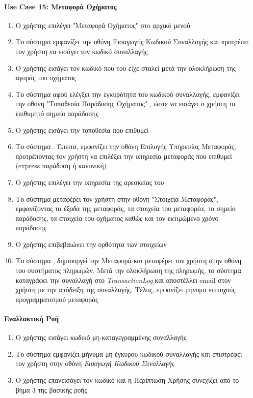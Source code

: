 \documentclass{../ol-softwaremanual}
\begin{document}
	\paragraph{\en Use Case 15: \gr Μεταφορά Οχήματος}  
	\begin{enumerate}
		\item Ο χρήστης επιλέγει \en"\gr Μεταφορά Οχήματος\en" \gr στο αρχικό μενού
		\item Το σύστημα εμφανίζει την οθόνη Εισαγωγής Κωδικού Συναλλαγής και προτρέπει τον χρήστη να εισάγει τον κωδικό συναλλαγής
		\item Ο χρήστης εισάγει τον κωδικό που του είχε σταλεί μετά την ολοκλήρωση της αγοράς του οχήματος
		\item Το σύστημα αφού ελέγξει την εγκυρότητα του κωδικού συναλλαγής, εμφανίζει την οθόνη \en"\gr Τοποθεσία Παράδοσης Οχήματος\en" \gr, ώστε να εισάγει ο χρήστη το επιθυμητό σημείο παράδοσης
		\item Ο χρήστης εισάγει την τοποθεσία που επιθυμεί
		\item Το σύστημα . Έπειτα, εμφανίζει την οθόνη Επιλογής Υπηρεσίας Μεταφοράς, προτρέποντας τον χρήστη να επιλέξει την υπηρεσία μεταφοράς που επιθυμεί (\en express \gr παράδοση ή κανονική)		
		\item Ο χρήστης επιλέγει την υπηρεσία της αρεσκείας του
		\item Το σύστημα μεταφέρει τον χρήστη στην οθόνη \en"\gr Στοιχεία Μεταφοράς\en"\gr, εμφανίζοντας τα έξοδα της μεταφοράς, τα στοιχεία του μεταφορέα, το σημείο παράδοσης, τα στοιχεία του οχήματος καθώς και τον εκτιμώμενο χρόνο παράδοσης 
		\item Ο χρήστης επιβεβαιώνει την ορθότητα των στοιχείων 
		\item Το σύστημα , δημιουργεί την Μεταφορά και μεταφέρει τον χρήστη στην οθόνη του συστήματος πληρωμών. Μετά την ολοκλήρωση της πληρωμής, το σύστημα καταγράφει την συναλλαγή στο \en \textit{TransactionLog} \gr	και αποστέλλει \en email \gr στον χρήστη με την απόδειξη της συναλλαγής. Τέλος, εμφανίζει μήνυμα επιτυχούς προγραμματισμού μεταφοράς
	\end{enumerate}
	
	\paragraph{Εναλλακτική Ροή}
	\begin{enumerate}
		\item Ο χρήστης εισάγει κωδικό μη-καταγεγραμμένης συναλλαγής
		\item Το σύστημα εμφανίζει μήνυμα μη-έγκυρου κωδικού συναλλαγής και επιστρέφει τον χρήστη στην οθόνη \textit{Εισαγωγή Κωδικού Συναλλαγής} 
		\item Ο χρήστης επανεισάγει τον κωδικό και η Περίπτωση Χρήσης συνεχίζει από το βήμα 3 της βασικής ροής
	\end{enumerate}
	
\end{document}
